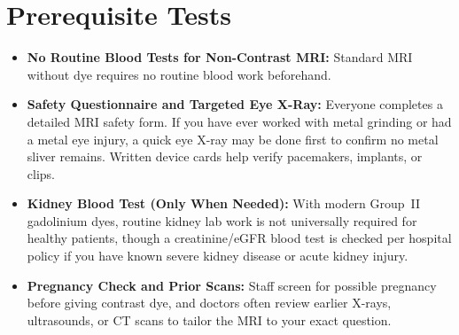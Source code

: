 \section{Prerequisite Tests}
\begin{itemize}
\item \textbf{No Routine Blood Tests for Non-Contrast MRI:} Standard MRI without dye requires no routine blood work beforehand.
\item \textbf{Safety Questionnaire and Targeted Eye X-Ray:} Everyone completes a detailed MRI safety form. If you have ever worked with metal grinding or had a metal eye injury, a quick eye X-ray may be done first to confirm no metal sliver remains. Written device cards help verify pacemakers, implants, or clips.
\item \textbf{Kidney Blood Test (Only When Needed):} With modern Group~II gadolinium dyes, routine kidney lab work is not universally required for healthy patients, though a creatinine/eGFR blood test is checked per hospital policy if you have known severe kidney disease or acute kidney injury.
\item \textbf{Pregnancy Check and Prior Scans:} Staff screen for possible pregnancy before giving contrast dye, and doctors often review earlier X-rays, ultrasounds, or CT scans to tailor the MRI to your exact question.
\end{itemize}

